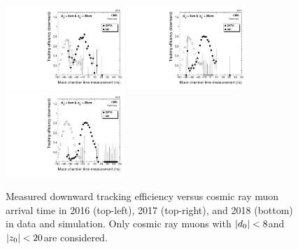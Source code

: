 \begin{figure}[hbtp]
\centering
\includegraphics[width=0.4\textwidth]{figures/tracking_eff/2016/Eff0vsMuon2Time.pdf}
\includegraphics[width=0.4\textwidth]{figures/tracking_eff/2017/Eff0vsMuon2Time.pdf}
\includegraphics[width=0.4\textwidth]{figures/tracking_eff/2018/Eff0vsMuon2Time.pdf}
\caption{Measured downward tracking efficiency versus cosmic ray muon arrival time in 2016 (top-left), 2017 (top-right), and 2018 (bottom) in data and simulation. Only cosmic ray muons with $\lvert d_0 \rvert<8$\cm and $\lvert z_0 \rvert<20$\cm are considered.}
\label{trk_eff_vs_arrival_time}
\end{figure}
